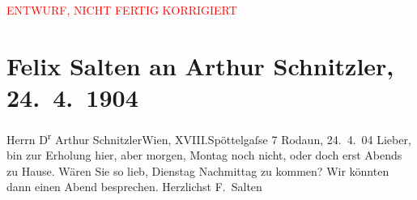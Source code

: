 
\begin{center}
            \textcolor{red}{ENTWURF, NICHT FERTIG KORRIGIERT}
                      \end{center}
            
         \renewcommand{\erwaehnteOrte}{Orte: Edmund-Weiß-Gasse, Rodaun, Wien, XVIII., Währing}
         \renewcommand{\erwaehnteWerke}{}
               \section[Felix Salten an Arthur Schnitzler, 24. 4. 1904]{ Felix Salten an Arthur Schnitzler, 24. 4. 1904}\nopagebreak{}\rehead{ }\begin{ledgroupsized}[t]{13cm}\normalsize\beginnumbering \toendnotes[C]{\smallbreak\pagebreak[2]} 
\pstart{}{\pb} Herrn D\textsuperscript{r} Arthur Schnitzler\pend{}\pstart{}Wien, XVIII.\pend{}\pstart{}Spöttelgaſse 7\pend{}{\bigskip}\pstart
           \raggedleft{}{\pb}Rodaun, 24. 4. 04\pend
           \pstart
           Lieber, bin zur Erholung hier, aber morgen, Montag noch
               nicht, oder doch erst Abends zu Hause. Wären Sie so lieb, Dienstag
               Nachmittag zu kommen? Wir könnten dann einen Abend besprechen. \pend
           \pstart Herzlichst \spacefill\mbox{F. Salten }\pend{}
         
         \endnumbering{}\end{ledgroupsized}\begin{anhang}\end{anhang}\newcommand{\dateiname}{L03396}\newcommand{\titel}{Felix Salten an Arthur Schnitzler, 24. 4. 1904}\newcommand{\editorInnen}{Martin Anton Müller und Laura Untner}
      